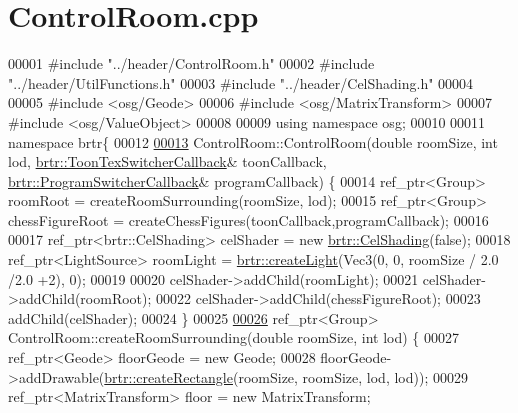 \hypertarget{_control_room_8cpp_source}{\section{Control\+Room.\+cpp}
\label{_control_room_8cpp_source}
}

\begin{DoxyCode}
00001 \textcolor{preprocessor}{#include "../header/ControlRoom.h"}
00002 \textcolor{preprocessor}{#include "../header/UtilFunctions.h"}
00003 \textcolor{preprocessor}{#include "../header/CelShading.h"}
00004 
00005 \textcolor{preprocessor}{#include <osg/Geode>}
00006 \textcolor{preprocessor}{#include <osg/MatrixTransform>}
00007 \textcolor{preprocessor}{#include <osg/ValueObject>}
00008 
00009 \textcolor{keyword}{using namespace }osg;
00010 
00011 \textcolor{keyword}{namespace }brtr\{
00012 
\hypertarget{_control_room_8cpp_source_l00013}{}\hyperlink{classbrtr_1_1_control_room_afb36cd27e18234098fbecd22ac325319}{00013}     ControlRoom::ControlRoom(\textcolor{keywordtype}{double} roomSize, \textcolor{keywordtype}{int} lod, 
      \hyperlink{classbrtr_1_1_toon_tex_switcher_callback}{brtr::ToonTexSwitcherCallback}& toonCallback, 
      \hyperlink{classbrtr_1_1_program_switcher_callback}{brtr::ProgramSwitcherCallback}& programCallback) \{
00014         ref\_ptr<Group> roomRoot = createRoomSurrounding(roomSize, lod);
00015         ref\_ptr<Group> chessFigureRoot = createChessFigures(toonCallback,programCallback);
00016 
00017         ref\_ptr<brtr::CelShading> celShader = \textcolor{keyword}{new} \hyperlink{classbrtr_1_1_cel_shading}{brtr::CelShading}(\textcolor{keyword}{false});
00018         ref\_ptr<LightSource> roomLight = \hyperlink{namespacebrtr_ad772c6dbc0a2cabd40a284676c124a97}{brtr::createLight}(Vec3(0, 0, roomSize / 2.0 /2.0 
      +2), 0);
00019 
00020         celShader->addChild(roomLight);
00021         celShader->addChild(roomRoot);
00022         celShader->addChild(chessFigureRoot);
00023         addChild(celShader);
00024     \}
00025 
\hypertarget{_control_room_8cpp_source_l00026}{}\hyperlink{classbrtr_1_1_control_room_a5dfafb496e18e8e4f6d792b144dd10b9}{00026}     ref\_ptr<Group> ControlRoom::createRoomSurrounding(\textcolor{keywordtype}{double} roomSize, \textcolor{keywordtype}{int} lod) \{
00027         ref\_ptr<Geode> floorGeode = \textcolor{keyword}{new} Geode;
00028         floorGeode->addDrawable(\hyperlink{namespacebrtr_a793c6ef7f57632fc5ac280b94f60dd65}{brtr::createRectangle}(roomSize, roomSize, lod, lod));
00029         ref\_ptr<MatrixTransform> floor = \textcolor{keyword}{new} MatrixTransform;

\end{DoxyCode}
